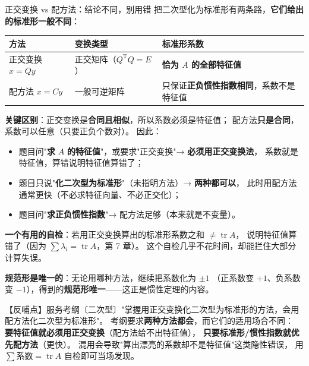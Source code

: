\begin{fdeep}{正交变换 vs 配方法：结论不同，别用错}
把二次型化为标准形有两条路，\textbf{它们给出的标准形一般不同}：

\begin{center}
\begin{tabular}{@{}lll@{}}
\toprule
方法 & 变换类型 & 标准形系数 \\
\midrule
正交变换 $x=Qy$ & 正交矩阵（$Q^{\mathrm T}Q=E$） & \textbf{恰为 $A$ 的全部特征值} \\
配方法 $x=Cy$ & 一般可逆矩阵 & 只保证\textbf{正负惯性指数相同}，系数不是特征值 \\
\bottomrule
\end{tabular}
\end{center}

\textbf{关键区别}：正交变换是\textbf{合同且相似}，所以系数必须是特征值；
配方法\textbf{只是合同}，系数可以任意（只要正负个数对）。
因此：
\begin{itemize}[leftmargin=2.2em,itemsep=0.22em]
\item 题目问"\textbf{求 }$A$\textbf{ 的特征值}"，或要求"正交变换"→ \textbf{必须用正交变换法}，
      系数就是特征值，算错说明特征值算错了；
\item 题目只说"\textbf{化二次型为标准形}"（未指明方法）→ \textbf{两种都可以}，
      此时用配方法通常更快（不必求特征向量、不必正交化）；
\item 题目问"\textbf{求正负惯性指数}"→ 配方法足够（本来就是不变量）。
\end{itemize}
\textbf{一个有用的自检}：若用正交变换算出的标准形系数之和 $\ne\operatorname{tr}A$，
说明特征值算错了（因为 $\sum\lambda_i=\operatorname{tr}A$，第 7 章）。
这个自检几乎不花时间，却能拦住大部分计算失误。

\textbf{规范形是唯一的}：无论用哪种方法，继续把系数化为 $\pm1$
（正系数变 $+1$、负系数变 $-1$），得到的\textbf{规范形唯一}——这正是惯性定理的内容。

【反哺点】服务考纲〔二次型〕"掌握用正交变换化二次型为标准形的方法，会用配方法化二次型为标准形"。
考纲要求\textbf{两种方法都会}，而它们的适用场合不同：
\textbf{要特征值就必须用正交变换}（配方法给不出特征值），
\textbf{只要标准形/惯性指数就优先配方法}（更快）。
混用会导致"算出漂亮的系数却不是特征值"这类隐性错误，
用 $\sum\text{系数}=\operatorname{tr}A$ 自检即可当场发现。
\end{fdeep}
